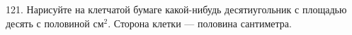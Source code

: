 121. Нарисуйте на клетчатой бумаге какой-нибудь десятиугольник с площадью десять с половиной $\text{см}^2.$ Сторона клетки --- половина сантиметра.\\
